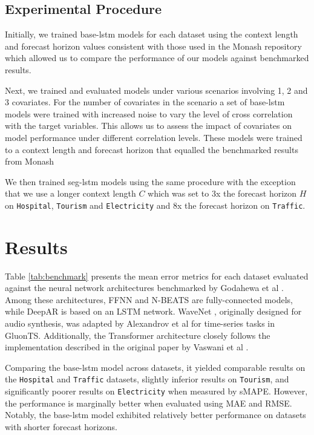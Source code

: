 \documentclass{article}
\newcommand{\horizon}{H}
\newcommand{\contextlength}{C}
\begin{document}
\subsection{Experimental Procedure}
Initially, we trained base-lstm models for each dataset using the context length and forecast horizon values consistent with 
those used in the Monash repository which allowed us to compare the performance of our models 
against benchmarked results. 

Next, we trained and evaluated models under various scenarios involving 1, 2 and 3 
covariates. For the number of covariates in the scenario a set of base-lstm models were trained with increased noise to vary the 
level of cross correlation with the target variables.  This allows us to assess the impact of covariates on model performance under 
different correlation levels. These models were trained to a context length and forecast horizon that equalled the benchmarked 
results from Monash \cite{DBLP:conf/nips/GodahewaBWHM21}

We then trained seg-lstm models using the same procedure with the exception that we use a longer context 
length $\contextlength$ which was set to 3x the forecast horizon $\horizon$ on \texttt{Hospital}, \texttt{Tourism} and \texttt{Electricity} and 8x the forecast horizon on \texttt{Traffic}. 

\section{Results}
Table \ref{tab:benchmark} presents the mean error metrics for each dataset evaluated against the neural network architectures benchmarked 
by Godahewa et al \cite{DBLP:conf/nips/GodahewaBWHM21}. Among these architectures, FFNN and N-BEATS \cite{oreshkin2020nbeats} are fully-connected models, 
while DeepAR \cite{salinas2019deepar} is based on an LSTM network. WaveNet \cite{oord2016wavenet}, originally designed for 
audio synthesis, was adapted by Alexandrov et al \cite{gluonts_arxiv} for time-series tasks in GluonTS. Additionally, the Transformer 
architecture closely follows the implementation described in the original paper by Vaswani et al \cite{vaswani2023attention}.

Comparing the base-lstm model across datasets, it yielded comparable results on the \texttt{Hospital} and \texttt{Traffic} datasets, 
slightly inferior results on \texttt{Tourism}, and significantly poorer results on \texttt{Electricity} when measured by sMAPE. However, 
the performance is marginally better when evaluated using MAE and RMSE. Notably, the base-lstm model exhibited relatively better performance on datasets with shorter forecast horizons.
\end{document}
